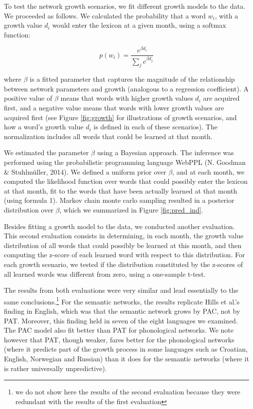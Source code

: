 \documentclass[10pt, letterpaper]{article}
\begin{document}
To test the network growth scenarios, we fit different growth models to
the data. We proceeded as follows. We calculated the probability that a
word \(w_i\), with a growth value \(d_i\) would enter the lexicon at a
given month, using a softmax function:

\begin{equation}
 p(w_i)= \frac{e^{\beta d_i}}{\sum_j e^{\beta d_j} }
\end{equation}

\noindent where \(\beta\) is a fitted parameter that captures the
magnitude of the relationship between network parameters and growth
(analogous to a regression coefficient). A positive value of \(\beta\)
means that words with higher growth values \(d_i\) are acquired first,
and a negative value means that words with lower growth values are
acquired first (see Figure \ref{fig:growth} for illustrations of growth
scenarios, and how a word's growth value \(d_i\) is defined in each of
these scenarios). The normalization includes all words that could be
learned at that month.

We estimated the parameter \(\beta\) using a Bayesian approach. The
inference was performed using the probabilistic programming language
WebPPL (N. Goodman \& Stuhlmüller, 2014). We defined a uniform prior
over \(\beta\), and at each month, we computed the likelihood function
over words that could possibly enter the lexicon at that month, fit to
the words that have been actually learned at that month (using formula
1). Markov chain monte carlo sampling resulted in a posterior
distribution over \(\beta\), which we summarized in Figure
\ref{fig:pred_ind}.

Besides fitting a growth model to the data, we conducted another
evaluation. This second evaluation consists in determining, in each
month, the growth value distribution of all words that could possibly be
learned at this month, and then computing the z-score of each learned
word with respect to this distribution. For each growth scenario, we
tested if the distribution constituted by the z-scores of all learned
words was different from zero, using a one-sample t-test.

The results from both evaluations were very similar and lead essentially
to the same
conclusions.\footnote{we do not show here the results of the second evaluation because they were redundant with the results of the first evaluation}
For the semantic networks, the results replicate Hills et al.'s finding
in English, which was that the semantic network grows by PAC, not by
PAT. Moreover, this finding held in seven of the eight languages we
examined. The PAC model also fit better than PAT for phonological
networks. We note however that PAT, though weaker, fares better for the
phonological networks (where it predicts part of the growth process in
some languages such as Croatian, English, Norwegian and Russian) than it
does for the semantic networks (where it is rather universally
unpredictive).
\end{document}
